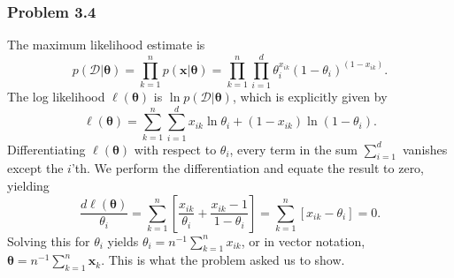 \documentclass[12pt, a4paper]{article}
\newcommand{\D}{\mathcal{D}}
\newcommand{\vect}[1]{\bm{#1}}
\begin{document}
\subsubsection*{Problem 3.4}
The maximum likelihood estimate is 
\begin{equation*}
	p( \D | \vect{\theta}) = \prod_{k = 1}^{n} p( \vect{x} | \vect{\theta}) = \prod_{k = 1}^{n} \prod_{i=1}^{d}
	\theta_{i}^{x_{ik}} \left( 1 - \theta_i \right)^{\left(  1 - x_{ik} \right)}.
\end{equation*}
 The log likelihood $\ell(\vect{\theta})$ is $ \ln p( \D | \vect{\theta}) $, which is explicitly given by
 \begin{equation*}
 	\ell(\vect{\theta}) = \sum_{k = 1}^{n} \sum_{i=1}^{d}
 	x_{ik} \ln \theta_i + (1 - x_{ik}) \ln \left( 1 - \theta_i\right).
 \end{equation*}
Differentiating $\ell(\vect{\theta})$ with respect to $\theta_i$, every term in the sum $\sum_{i=1}^{d}$ vanishes except the $i$'th.
We perform the differentiation and equate the result to zero, yielding
\begin{equation*}
	\frac{d \ell(\vect{\theta})}{\theta_i} = \sum_{k=1}^{n} \left[ \frac{x_{ik}}{\theta_i} + \frac{x_{ik} - 1}{1 - \theta_i} \right] =
	 \sum_{k=1}^{n} \left[ x_{ik} - \theta_i \right] = 0.
\end{equation*}
Solving this for $\theta_i$ yields $\theta_i = n^{-1} \sum_{k=1}^{n} x_{ik}$, or in vector notation, $\vect{\theta} = n^{-1} \sum_{k=1}^{n} \vect{x}_k$.
This is what the problem asked us to show.
\end{document}
